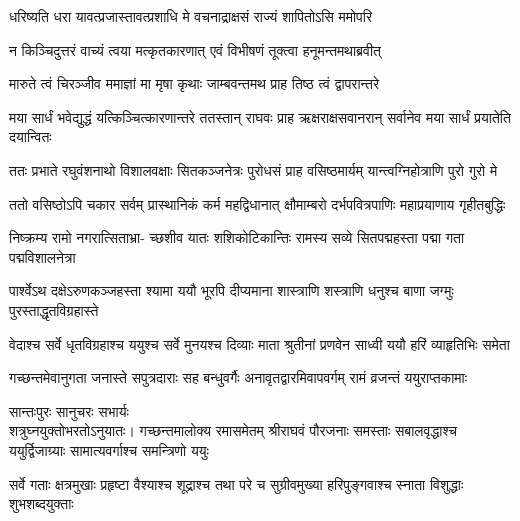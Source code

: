 \twolineshloka
{धरिष्यति धरा यावत्प्रजास्तावत्प्रशाधि मे}
{वचनाद्राक्षसं राज्यं शापितोऽसि ममोपरि} %

\twolineshloka
{न किञ्चिदुत्तरं वाच्यं त्वया मत्कृतकारणात्}
{एवं विभीषणं तूक्त्वा हनूमन्तमथाब्रवीत्} %

\twolineshloka
{मारुते त्वं चिरञ्जीव ममाज्ञां मा मृषा कृथाः}
{जाम्बवन्तमथ प्राह तिष्ठ त्वं द्वापरान्तरे} %

\threelineshloka
{मया सार्धं भवेद्युद्धं यत्किञ्चित्कारणान्तरे}
{ततस्तान् राघवः प्राह ऋक्षराक्षसवानरान्}
{सर्वानेव मया सार्धं प्रयातेति दयान्वितः} %

\fourlineindentedshloka
{ततः प्रभाते रघुवंशनाथो}
{विशालवक्षाः सितकञ्जनेत्रः}
{पुरोधसं प्राह वसिष्ठमार्यम्}
{यान्त्वग्निहोत्राणि पुरो गुरो मे} %

\fourlineindentedshloka
{ततो वसिष्ठोऽपि चकार सर्वम्}
{प्रास्थानिकं कर्म महद्विधानात्}
{क्षौमाम्बरो दर्भपवित्रपाणिः}
{महाप्रयाणाय गृहीतबुद्धिः} %

\fourlineindentedshloka
{निष्क्रम्य रामो नगरात्सिताभ्रा-}
{च्छशीव यातः शशिकोटिकान्तिः}
{रामस्य सव्ये सितपद्महस्ता}
{पद्मा गता पद्मविशालनेत्रा} %

\fourlineindentedshloka
{पार्श्वेऽथ दक्षेऽरुणकञ्जहस्ता}
{श्यामा ययौ भूरपि दीप्यमाना}
{शास्त्राणि शस्त्राणि धनुश्च बाणा}
{जग्मुः पुरस्ताद्धृतविग्रहास्ते} %

\fourlineindentedshloka
{वेदाश्च सर्वे धृतविग्रहाश्च}
{ययुश्च सर्वे मुनयश्च दिव्याः}
{माता श्रुतीनां प्रणवेन साध्वी}
{ययौ हरिं व्याहृतिभिः समेता} %

\fourlineindentedshloka
{गच्छन्तमेवानुगता जनास्ते}
{सपुत्रदाराः सह बन्धुवर्गैः}
{अनावृतद्वारमिवापवर्गम्}
{रामं व्रजन्तं ययुराप्तकामाः}%

\begin{minipage}{\linewidth}
\centering
{\hspace{-9ex}सान्तःपुरः\hspace{0.5ex} सानुचरः \hspace{0.5ex}सभार्यः}\\
{\hspace{-1ex}शत्रुघ्नयुक्तो\hspace{3ex}भरतोऽनुयातः।} 
\fourlineindentedshloka
{गच्छन्तमालोक्य रमासमेतम्}
{श्रीराघवं पौरजनाः समस्ताः}
{सबालवृद्धाश्च ययुर्द्विजाग्र्याः}
{सामात्यवर्गाश्च समन्त्रिणो ययुः} %
\end{minipage}

\fourlineindentedshloka
{सर्वे गताः क्षत्रमुखाः प्रहृष्टा}
{वैश्याश्च शूद्राश्च तथा परे च}
{सुग्रीवमुख्या हरिपुङ्गवाश्च}
{स्नाता विशुद्धाः शुभशब्दयुक्ताः} %

